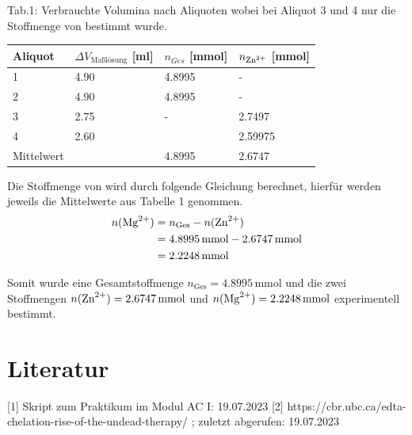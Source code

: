 \documentclass[12pt]{scrartcl} %
\begin{document}
\begin{center}
  Tab.1: Verbrauchte Volumina nach Aliquoten wobei bei Aliquot 3 und 4 nur die Stoffmenge von  bestimmt wurde.\\
\begin{tabular}{l l l l}
  \hline
  Aliquot & $\Delta V_{\text{Maßlösung}}$ [ml] & $n_{Ges}$ [mmol] & $n_{\ce{Zn^{2+}}}$ [mmol]\\
  \hline
  1 & 4.90 & 4.8995 & -\\
  2 & 4.90 & 4.8995 & -\\
  3 & 2.75 & - & 2.7497\\
  4 & 2.60 & & 2.59975 \\
  \hline
  Mittelwert & & 4.8995 & 2.6747\\
\hline
\end{tabular}
\end{center}

Die Stoffmenge von  wird durch folgende Gleichung berechnet, hierfür werden jeweils die Mittelwerte aus Tabelle 1 genommen.
\begin{align*}
  n(\ce{Mg^{2+}}) &= n_{\mathrm{Ges}} - n(\ce{Zn^{2+}})\\
  &= 4.8995\,\mathrm{mmol} - 2.6747\,\mathrm{mmol}\\
  &= 2.2248\,\mathrm{mmol}
\end{align*}

Somit wurde eine Gesamtstoffmenge $n_{\mathrm{Ges}} = 4.8995\,\mathrm{mmol}$ und die zwei Stoffmengen $n(\ce{Zn^{2+}}) = 2.6747\,\mathrm{mmol}$ und $n(\ce{Mg^{2+}}) = 2.2248\,\mathrm{mmol}$ experimentell bestimmt.

\section{Literatur}
[1] Skript zum Praktikum im Modul AC I: 19.07.2023
[2] https://cbr.ubc.ca/edta-chelation-rise-of-the-undead-therapy/ ; zuletzt abgerufen: 19.07.2023
\end{document}
